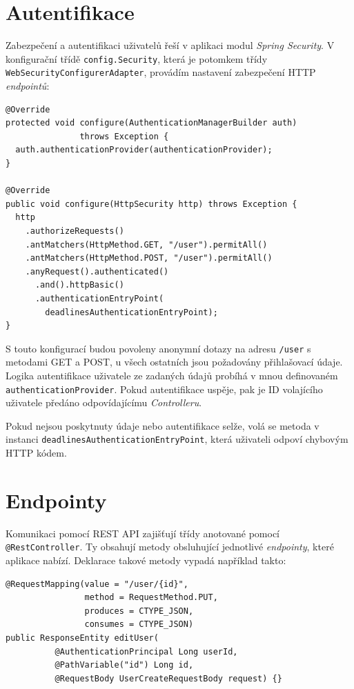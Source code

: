 \documentclass[thesis=B,czech]{FITthesis}[2012/06/26]
\begin{document}
	\section{Autentifikace}
		Zabezpečení a autentifikaci uživatelů řeší v aplikaci modul \textit{Spring Security}. \cite{spring-security} V konfigurační třídě \texttt{config.Security}, která je potomkem třídy \texttt{WebSecurityConfigurerAdapter}, provádím nastavení zabezpečení HTTP \textit{endpointů}:
		\begin{Verbatim}
@Override
protected void configure(AuthenticationManagerBuilder auth) 
               throws Exception {
  auth.authenticationProvider(authenticationProvider);
}
		
@Override
public void configure(HttpSecurity http) throws Exception {
  http
    .authorizeRequests()
    .antMatchers(HttpMethod.GET, "/user").permitAll()
    .antMatchers(HttpMethod.POST, "/user").permitAll()
    .anyRequest().authenticated()
      .and().httpBasic()
      .authenticationEntryPoint(
        deadlinesAuthenticationEntryPoint);
}
		\end{Verbatim}
	
		S touto konfigurací budou povoleny anonymní dotazy na adresu \texttt{/user} s metodami GET a POST, u všech ostatních jsou požadovány přihlašovací údaje. Logika autentifikace uživatele ze zadaných údajů probíhá v mnou definovaném \texttt{authenticationProvider}. Pokud autentifikace uspěje, pak je ID volajícího uživatele předáno odpovídajícímu \textit{Controlleru}.
	
		Pokud nejsou poskytnuty údaje nebo autentifikace selže, volá se metoda v instanci \texttt{deadlinesAuthenticationEntryPoint}, která uživateli odpoví chybovým HTTP kódem.
	
	\section{Endpointy}
		Komunikaci pomocí REST API zajišťují třídy anotované pomocí \texttt{@RestController}. Ty obsahují metody obsluhující jednotlivé \textit{endpointy}, které aplikace nabízí. Deklarace takové metody vypadá například takto:
		\begin{Verbatim}
@RequestMapping(value = "/user/{id}", 
                method = RequestMethod.PUT, 
                produces = CTYPE_JSON, 
                consumes = CTYPE_JSON)
public ResponseEntity editUser(
          @AuthenticationPrincipal Long userId,
          @PathVariable("id") Long id,
          @RequestBody UserCreateRequestBody request) {}
		\end{Verbatim}
	
\end{document}
